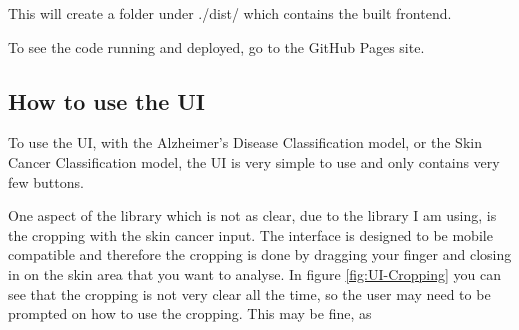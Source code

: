 \documentclass[]{final_report}
\begin{document}
This will create a folder under ./dist/ which contains the built frontend.

To see the code running and deployed, go to the GitHub Pages site\cite{Hosted-UI}.

\subsection{How to use the UI}

To use the UI, with the Alzheimer's Disease Classification model, or the Skin Cancer Classification model,
the UI is very simple to use and only contains very few buttons.

One aspect of the library which is not as clear, due to the library I am using, is the cropping with the skin cancer input.
The interface is designed to be mobile compatible and therefore the cropping is done by dragging your finger and closing in on the skin area that you want to analyse.
In figure \ref{fig:UI-Cropping} you can see that the cropping is not very clear all the time, so the user may need to be prompted on how to use the cropping.
This may be fine, as 
\end{document}
